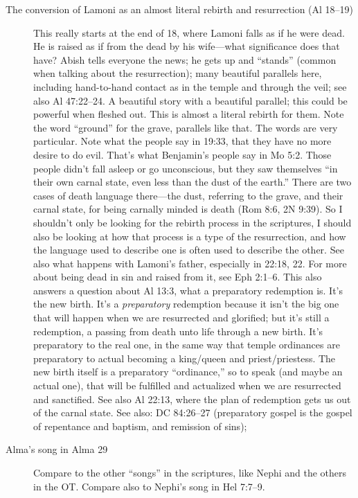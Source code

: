 \begin{description}
		\item[The conversion of Lamoni as an almost literal rebirth and resurrection (Al 18--19)]
			This really starts at the end of 18, where Lamoni falls as if he were dead. He is raised as if from the dead by his wife---what significance does that have? Abish tells everyone the news; he gets up and ``stands'' (common when talking about the resurrection); many beautiful parallels here, including hand-to-hand contact as in the temple and through the veil; see also Al 47:22--24. A beautiful story with a beautiful parallel; this could be powerful when fleshed out. This is almost a literal rebirth for them. Note the word ``ground'' for the grave, parallels like that. The words are very particular. Note what the people say in 19:33, that they have no more desire to do evil. That's what Benjamin's people say in Mo 5:2. Those people didn't fall asleep or go unconscious, but they saw themselves ``in their own carnal state, even less than the dust of the earth.'' There are two cases of death language there---the dust, referring to the grave, and their carnal state, for being carnally minded is death (Rom 8:6, 2N 9:39). So I shouldn't only be looking for the rebirth process in the scriptures, I should also be looking at how that process is a type of the resurrection, and how the language used to describe one is often used to describe the other.
			See also what happens with Lamoni's father, especially in 22:18, 22.
			For more about being dead in sin and raised from it, see Eph 2:1--6.
			This also answers a question about Al 13:3, what a preparatory redemption is. It's the new birth. It's a \textit{preparatory} redemption because it isn't the big one that will happen when we are resurrected and glorified; but it's still a redemption, a passing from death unto life through a new birth. It's preparatory to the real one, in the same way that temple ordinances are preparatory to actual becoming a king/queen and priest/priestess. The new birth itself is a preparatory ``ordinance,'' so to speak (and maybe an actual one), that will be fulfilled and actualized when we are resurrected and sanctified.
			See also Al 22:13, where the plan of redemption gets us out of the carnal state.
			See also:
				DC 84:26--27 (preparatory gospel is the gospel of repentance and baptism, and remission of sins); 
				
		\item[Alma's song in Alma 29]
			Compare to the other ``songs'' in the scriptures, like Nephi and the others in the OT. Compare also to Nephi's song in Hel 7:7--9.
			

\end{description}
